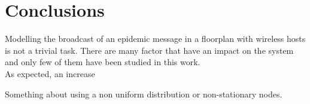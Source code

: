 %
\chapter{Conclusions}\label{ch:conclusions}

Modelling the broadcast of an epidemic message in a floorplan with wireless hosts is not a trivial task. There are many factor that have an impact on the system and only few of them have been studied in this work.\\
As expected, an increase


Something about using a non uniform distribution or non-stationary nodes.